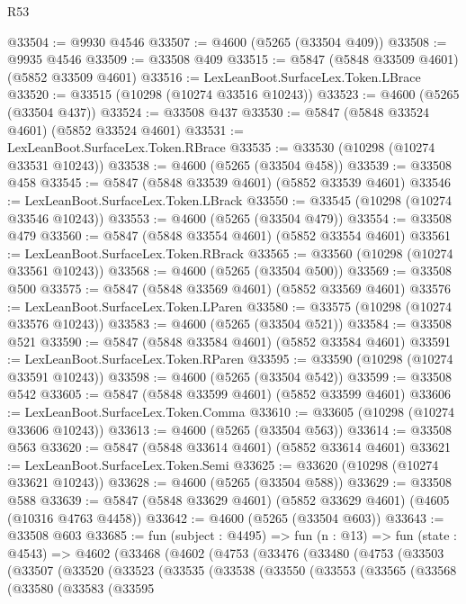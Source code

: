 \begin{lexlean}{R53}
\begin{coremodule}
@33504 := @9930 @4546
@33507 := @4600 (@5265 (@33504 @409))
@33508 := @9935 @4546
@33509 := @33508 @409
@33515 := @5847 (@5848 @33509 @4601) (@5852 @33509 @4601)
@33516 := LexLeanBoot.SurfaceLex.Token.LBrace
@33520 := @33515 (@10298 (@10274 @33516 @10243))
@33523 := @4600 (@5265 (@33504 @437))
@33524 := @33508 @437
@33530 := @5847 (@5848 @33524 @4601) (@5852 @33524 @4601)
@33531 := LexLeanBoot.SurfaceLex.Token.RBrace
@33535 := @33530 (@10298 (@10274 @33531 @10243))
@33538 := @4600 (@5265 (@33504 @458))
@33539 := @33508 @458
@33545 := @5847 (@5848 @33539 @4601) (@5852 @33539 @4601)
@33546 := LexLeanBoot.SurfaceLex.Token.LBrack
@33550 := @33545 (@10298 (@10274 @33546 @10243))
@33553 := @4600 (@5265 (@33504 @479))
@33554 := @33508 @479
@33560 := @5847 (@5848 @33554 @4601) (@5852 @33554 @4601)
@33561 := LexLeanBoot.SurfaceLex.Token.RBrack
@33565 := @33560 (@10298 (@10274 @33561 @10243))
@33568 := @4600 (@5265 (@33504 @500))
@33569 := @33508 @500
@33575 := @5847 (@5848 @33569 @4601) (@5852 @33569 @4601)
@33576 := LexLeanBoot.SurfaceLex.Token.LParen
@33580 := @33575 (@10298 (@10274 @33576 @10243))
@33583 := @4600 (@5265 (@33504 @521))
@33584 := @33508 @521
@33590 := @5847 (@5848 @33584 @4601) (@5852 @33584 @4601)
@33591 := LexLeanBoot.SurfaceLex.Token.RParen
@33595 := @33590 (@10298 (@10274 @33591 @10243))
@33598 := @4600 (@5265 (@33504 @542))
@33599 := @33508 @542
@33605 := @5847 (@5848 @33599 @4601) (@5852 @33599 @4601)
@33606 := LexLeanBoot.SurfaceLex.Token.Comma
@33610 := @33605 (@10298 (@10274 @33606 @10243))
@33613 := @4600 (@5265 (@33504 @563))
@33614 := @33508 @563
@33620 := @5847 (@5848 @33614 @4601) (@5852 @33614 @4601)
@33621 := LexLeanBoot.SurfaceLex.Token.Semi
@33625 := @33620 (@10298 (@10274 @33621 @10243))
@33628 := @4600 (@5265 (@33504 @588))
@33629 := @33508 @588
@33639 := @5847 (@5848 @33629 @4601) (@5852 @33629 @4601) (@4605 (@10316 @4763 @4458))
@33642 := @4600 (@5265 (@33504 @603))
@33643 := @33508 @603
@33685 := fun (subject : @4495) =>
  fun (n : @13) =>
  fun (state : @4543) =>
  @4602
    (@33468
      (@4602
        (@4753
          (@33476
            (@33480
              (@4753
                (@33503
                  (@33507
                    (@33520
                      (@33523
                        (@33535
                          (@33538
                            (@33550
                              (@33553
                                (@33565
                                  (@33568
                                    (@33580
                                      (@33583
                                        (@33595

\end{coremodule}
\end{lexlean}
